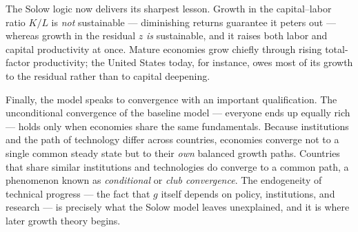 The Solow logic now delivers its sharpest lesson. Growth in the capital--labor ratio $K/L$ is \emph{not} sustainable --- diminishing returns guarantee it peters out --- whereas growth in the residual $z$ \emph{is} sustainable, and it raises both labor and capital productivity at once. Mature economies grow chiefly through rising total-factor productivity; the United States today, for instance, owes most of its growth to the residual rather than to capital deepening.

Finally, the model speaks to convergence with an important qualification. The unconditional convergence of the baseline model --- everyone ends up equally rich --- holds only when economies share the same fundamentals. Because institutions and the path of technology differ across countries, economies converge not to a single common steady state but to their \emph{own} balanced growth paths. Countries that share similar institutions and technologies do converge to a common path, a phenomenon known as \emph{conditional} or \emph{club convergence}. The endogeneity of technical progress --- the fact that $g$ itself depends on policy, institutions, and research --- is precisely what the Solow model leaves unexplained, and it is where later growth theory begins.

